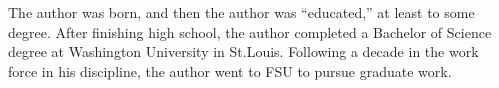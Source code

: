 \documentclass[11pt,expanded,copyright]{fsuthesis}
\begin{document}


\printbibliography





%


\begin{biosketch}
The author was born, and then the author was ``educated,'' at least to
some degree.  After finishing high school, the author
completed a Bachelor of Science degree at Washington University in St.Louis.
Following a decade in the work force in his discipline, the author
went to FSU to pursue graduate work.
\end{biosketch}

\end{document}
